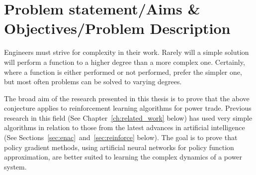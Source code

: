 \section{Problem statement/Aims \& Objectives/Problem Description}

Engineers must strive for complexity in their work.  Rarely will a simple
solution will perform a function to a higher degree than a more complex one.
Certainly, where a function is either performed or not performed, prefer the
simpler one, but most often problems can be solved to varying degrees.

The broad aim of the research presented in this thesis is to prove that the
above conjecture applies to reinforcement learning algorithms for power trade.
Previous research in this field (See Chapter~\ref{ch:related_work} below) has
used very simple algorithms in relation to those from the latest advances in
artificial intelligence (See Sections~\ref{sec:enac}~and~\ref{sec:reinforce}
below).  The goal is to prove that policy gradient methods, using artificial
neural networks for policy function approximation, are better suited to
learning the complex dynamics of a power system.

